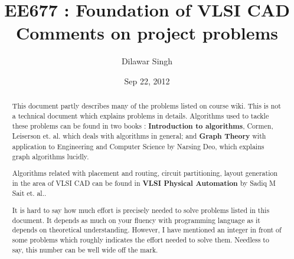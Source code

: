 \documentclass[a4paper,10pt]{article}
\title{EE677 : \textbf{Foundation of VLSI CAD} \\
Comments on project problems}
\author{Dilawar Singh}
\date{Sep 22, 2012}
\begin{document}
\maketitle

\begin{abstract}

  This document partly describes many of the problems listed on course wiki.
  This is not a technical document which explains problems in details.
  Algorithms used to tackle these problems can be found in two books :
  \textbf{Introduction to algorithms}, Cormen, Leiserson et. al.  which deals
  with algorithms in general; and \textbf{Graph Theory} with application to
  Engineering and Computer Science by Narsing Deo, which explains graph
  algorithms lucidly.

  Algorithms related with placement and routing, circuit partitioning, layout
  generation in the area of VLSI CAD can be found in \textbf{VLSI Physical
  Automation} by Sadiq M Sait et. al.. 

  It is hard to say how much effort is precisely needed to solve problems listed
  in this document. It depends as much on your fluency with programming language
  as it depends on theoretical understanding. However, I have mentioned an
  integer in front of some problems which roughly indicates the effort needed to
  solve them. Needless to say, this number can be well wide off the mark.

\end{abstract}





\end{document}

